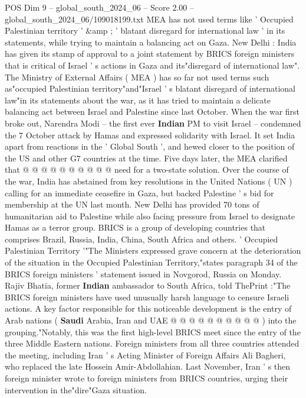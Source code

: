 \begin{textsample}{POS Dim 9 – global\_south\_2024\_06 – Score 2.00 – global\_south\_2024\_06/109018199.txt}  \label{ex:f9_pos_086}
MEA has not used terms like ' Occupied Palestinian territory ' \&amp ; ' blatant disregard for international law ' in its statements, while trying to maintain a balancing act on Gaza.
New Delhi : India has given its stamp of approval to a joint statement by BRICS foreign ministers that is critical of Israel ' s actions in Gaza and its"disregard of international law".
The Ministry of External Affairs ( MEA ) has so far not used terms such as"occupied Palestinian territory"and"Israel ' s blatant disregard of international law"in its statements about the war, as it has tried to maintain a delicate balancing act between Israel and Palestine since last October.
When the war first broke out, Narendra Modi -- the first ever \textbf{Indian} PM to visit Israel -- condemned the 7 October attack by Hamas and expressed solidarity with Israel.
It set India apart from reactions in the ' Global South ', and hewed closer to the position of the US and other G7 countries at the time.
Five days later, the MEA clarified that @ @ @ @ @ @ @ @ @ @ need for a two-state solution.
Over the course of the war, India has abstained from key resolutions in the United Nations ( UN ) calling for an immediate ceasefire in Gaza, but backed Palestine ' s bid for membership at the UN last month.
New Delhi has provided 70 tons of humanitarian aid to Palestine while also facing pressure from Israel to designate Hamas as a terror group.
BRICS is a group of developing countries that comprises Brazil, Russia, India, China, South Africa and others. ' Occupied Palestinian Territory '"The Ministers expressed grave concern at the deterioration of the situation in the Occupied Palestinian Territory,"states paragraph 34 of the BRICS foreign ministers ' statement issued in Novgorod, Russia on Monday.
Rajiv Bhatia, former \textbf{Indian} ambassador to South Africa, told ThePrint :"The BRICS foreign ministers have used unusually harsh language to censure Israeli actions.
A key factor responsible for this noticeable development is the entry of Arab nations ( \textbf{Saudi} Arabia, Iran and UAE @ @ @ @ @ @ @ @ @ @ ) into the grouping."Notably, this was the first high-level BRICS meet since the entry of the three Middle Eastern nations.
Foreign ministers from all three countries attended the meeting, including Iran ' s Acting Minister of Foreign Affairs Ali Bagheri, who replaced the late Hossein Amir-Abdollahian.
Last November, Iran ' s then foreign minister wrote to foreign ministers from BRICS countries, urging their intervention in the"dire"Gaza situation.

\end{textsample}

